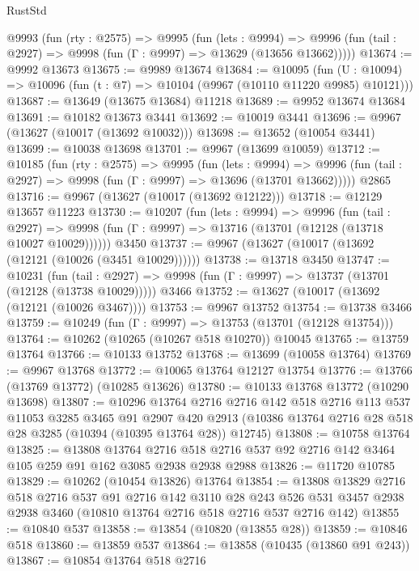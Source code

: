 \begin{lexlean}{RustStd}
\begin{coremodule}
{\begin{coremodule}
{{{{{{{{{{{{{{{{{{{{{{{{{{{{{{{{{{{{{{{{{{{{{{{{{{{{{{{{{{{{{{{{{{{{{{{{{{{{{{  @9993
    (fun (rty : @2575) =>
    @9995
      (fun (lets : @9994) =>
      @9996 (fun (tail : @2927) => @9998 (fun (Γ : @9997) => @13629 (@13656 @13662)))))
@13674 := @9992 @13673
@13675 := @9989 @13674
@13684 := @10095
    (fun (U : @10094) => @10096 (fun (t : @7) => @10104 (@9967 (@10110 @11220 @9985) @10121)))
@13687 := @13649 (@13675 @13684) @11218
@13689 := @9952 @13674 @13684
@13691 := @10182 @13673 @3441
@13692 := @10019 @3441
@13696 := @9967 (@13627 (@10017 (@13692 @10032)))
@13698 := @13652 (@10054 @3441)
@13699 := @10038 @13698
@13701 := @9967 (@13699 @10059)
@13712 := @10185
    (fun (rty : @2575) =>
    @9995
      (fun (lets : @9994) =>
      @9996 (fun (tail : @2927) => @9998 (fun (Γ : @9997) => @13696 (@13701 @13662)))))
    @2865
@13716 := @9967 (@13627 (@10017 (@13692 @12122)))
@13718 := @12129 @13657 @11223
@13730 := @10207
    (fun (lets : @9994) =>
    @9996
      (fun (tail : @2927) =>
      @9998 (fun (Γ : @9997) => @13716 (@13701 (@12128 (@13718 @10027 @10029))))))
    @3450
@13737 := @9967 (@13627 (@10017 (@13692 (@12121 (@10026 (@3451 @10029))))))
@13738 := @13718 @3450
@13747 := @10231
    (fun (tail : @2927) => @9998 (fun (Γ : @9997) => @13737 (@13701 (@12128 (@13738 @10029)))))
    @3466
@13752 := @13627 (@10017 (@13692 (@12121 (@10026 @3467))))
@13753 := @9967 @13752
@13754 := @13738 @3466
@13759 := @10249 (fun (Γ : @9997) => @13753 (@13701 (@12128 @13754)))
@13764 := @10262 (@10265 (@10267 @518 @10270)) @10045
@13765 := @13759 @13764
@13766 := @10133 @13752
@13768 := @13699 (@10058 @13764)
@13769 := @9967 @13768
@13772 := @10065 @13764 @12127 @13754
@13776 := @13766 (@13769 @13772) (@10285 @13626)
@13780 := @10133 @13768 @13772 (@10290 @13698)
@13807 := @10296
    @13764
    @2716
    @2716
    @142
    @518
    @2716
    @113
    @537
    @11053
    @3285
    @3465
    @91
    @2907
    @420
    @2913
    (@10386 @13764 @2716 @28 @518 @28 @3285 (@10394 (@10395 @13764 @28)) @12745)
@13808 := @10758 @13764
@13825 := @13808
    @13764
    @2716
    @518
    @2716
    @537
    @92
    @2716
    @142
    @3464
    @105
    @259
    @91
    @162
    @3085
    @2938
    @2938
    @2988
@13826 := @11720 @10785
@13829 := @10262 (@10454 @13826) @13764
@13854 := @13808
    @13829
    @2716
    @518
    @2716
    @537
    @91
    @2716
    @142
    @3110
    @28
    @243
    @526
    @531
    @3457
    @2938
    @2938
    @3460
    (@10810 @13764 @2716 @518 @2716 @537 @2716 @142)
@13855 := @10840 @537
@13858 := @13854 (@10820 (@13855 @28))
@13859 := @10846 @518
@13860 := @13859 @537
@13864 := @13858 (@10435 (@13860 @91 @243))
@13867 := @10854 @13764 @518 @2716
}}}}}}}}}}}}}}}}}}}}}}}}}}}}}}}}}}}}}}}}}}}}}}}}}}}}}}}}}}}}}}}}}}}}}}}}}}}}}}
\end{coremodule}}
\end{coremodule}
\end{lexlean}
